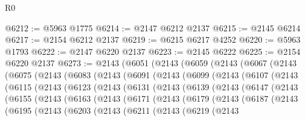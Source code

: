 \begin{lexlean}{R0}
\begin{coremodule}
@6212 := @5963 @1775
@6214 := @2147 @6212 @2137
@6215 := @2145 @6214
@6217 := @2154 @6212 @2137
@6219 := @6215 @6217 @4252
@6220 := @5963 @1793
@6222 := @2147 @6220 @2137
@6223 := @2145 @6222
@6225 := @2154 @6220 @2137
@6273 := @2143
    (@6051
      (@2143
        (@6059
          (@2143
            (@6067
              (@2143
                (@6075
                  (@2143
                    (@6083
                      (@2143
                        (@6091
                          (@2143
                            (@6099
                              (@2143
                                (@6107
                                  (@2143
                                    (@6115
                                      (@2143
                                        (@6123
                                          (@2143
                                            (@6131
                                              (@2143
                                                (@6139
                                                  (@2143
                                                    (@6147
                                                      (@2143
                                                        (@6155
                                                          (@2143
                                                            (@6163
                                                              (@2143
                                                                (@6171
                                                                  (@2143
                                                                    (@6179
                                                                      (@2143
                                                                        (@6187
                                                                          (@2143
                                                                            (@6195
                                                                              (@2143
                                                                                (@6203
                                                                                  (@2143
                                                                                    (@6211
                                                                                      (@2143
                                                                                        (@6219
                                                                                          (@2143

\end{coremodule}
\end{lexlean}
